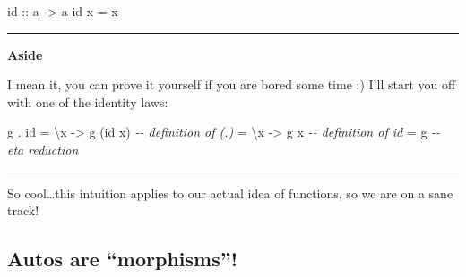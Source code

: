 \documentclass[]{article}
\newenvironment{Shaded}{}{}
\newcommand{\CommentTok}[1]{\textcolor[rgb]{0.38,0.63,0.69}{\textit{#1}}}
\newcommand{\DecValTok}[1]{\textcolor[rgb]{0.25,0.63,0.44}{#1}}
\newcommand{\FunctionTok}[1]{\textcolor[rgb]{0.02,0.16,0.49}{#1}}
\newcommand{\NormalTok}[1]{#1}
\newcommand{\OperatorTok}[1]{\textcolor[rgb]{0.40,0.40,0.40}{#1}}
\newcommand{\OtherTok}[1]{\textcolor[rgb]{0.00,0.44,0.13}{#1}}
\begin{document}
\begin{Shaded}
\begin{Highlighting}[]
\FunctionTok{id}\OtherTok{ ::}\NormalTok{ a }\OtherTok{{-}>}\NormalTok{ a}
\FunctionTok{id}\NormalTok{ x }\OtherTok{=}\NormalTok{ x}
\end{Highlighting}
\end{Shaded}

\begin{Shaded}
\end{Shaded}

\begin{center}\rule{0.5\linewidth}{\linethickness}\end{center}

\textbf{Aside}

I mean it, you can prove it yourself if you are bored some time :) I'll start
you off with one of the identity laws:

\begin{Shaded}
\begin{Highlighting}[]
\NormalTok{g }\OperatorTok{.} \FunctionTok{id} \OtherTok{=}\NormalTok{ \textbackslash{}x }\OtherTok{{-}>}\NormalTok{ g (}\FunctionTok{id}\NormalTok{ x)     }\CommentTok{{-}{-} definition of (.)}
       \OtherTok{=}\NormalTok{ \textbackslash{}x }\OtherTok{{-}>}\NormalTok{ g x          }\CommentTok{{-}{-} definition of id}
       \OtherTok{=}\NormalTok{ g                  }\CommentTok{{-}{-} eta reduction}
\end{Highlighting}
\end{Shaded}

\begin{center}\rule{0.5\linewidth}{\linethickness}\end{center}

So cool\ldots this intuition applies to our actual idea of functions, so we are
on a sane track!

\hypertarget{autos-are-morphisms}{%
\subsection{Autos are ``morphisms''!}\label{autos-are-morphisms}}
\end{document}
